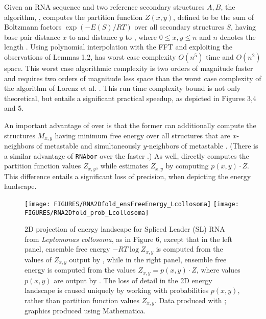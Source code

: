 Given an RNA sequence \seq and two reference secondary structures $A,B$,
the algorithm, \ffttwo, computes the partition
function $Z(x,y)$, defined to be the sum of Boltzmann factors
$\exp(-E(S)/RT)$ over all secondary structures $S$, having base pair
distance $x$ to  \strA and distance $y$ to \strB, where
$0 \leq x,y \leq n$ and $n$ denotes the length \seq.
Using polynomial interpolation with the FFT and exploiting the observations
of Lemmas 1,2, \ffttwo has worst case complexity
$O(n^5)$ time and $O(n^2)$ space. This worst case
algorithmic complexity is two orders of magnitude faster and requires two
orders of magnitude less space than the worst case complexity of the
algorithm \rnatwofold of Lorenz et al. \citep{hofacker:RNAbor2D}.
This run time complexity bound is not only theoretical, but entails
a significant practical speedup, as depicted in
Figures 3,4 and 5.

An important advantage of
\rnatwofold over \ffttwo is that the former can additionally
compute the structures $M_{x,y}$ having minimum free energy over all
structures that are $x$-neighbors of metastable \strA and simultaneously
$y$-neighbors of metastable \strB. (There is a similar advantage of {\tt RNAbor}
\citep{Freyhult.b07} over the faster \fftbor \citep{fftbor}.)
As well, \rnatwofold directly computes the partition function values
$Z_{x,y}$, while \ffttwo estimates $Z_{x,y}$ by computing
$p(x,y) \cdot Z$. This difference entails a significant loss of precision,
when depicting the energy landscape.


\begin{figure}[!t]
\begin{center}
\texttt{[image: FIGURES/RNA2Dfold\_ensFreeEnergy\_Lcollosoma]}
\hskip 1cm
\texttt{[image: FIGURES/RNA2Dfold\_prob\_Lcollosoma]}
\caption{\small
2D projection of energy landscape for Spliced Leader (SL) RNA
from {\em Leptomonas collosoma}, as in
Figure 6,
except that in the left panel, ensemble free energy $-RT \log Z_{x,y}$
is computed from the values of $Z_{x,y}$ output by \rnatwofold,
while in the right panel, ensemble free energy is computed from
the values $Z_{x,y} = p(x,y) \cdot Z$, where values $p(x,y)$ are output
by \rnatwofold.
The loss of detail in the 2D energy landscape is caused uniquely by
working with probabilities $p(x,y)$, rather than partition function
values $Z_{x,y}$.
Data produced with \rnatwofold; graphics produced using Mathematica.
}
\label{fig:heatmapRNA2Dfold}
\end{center}
\end{figure}

